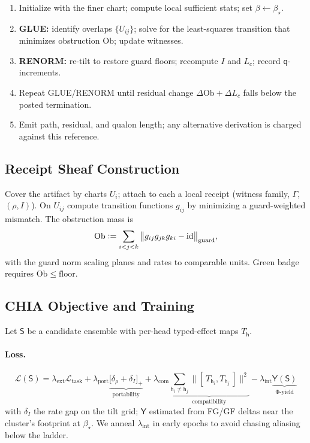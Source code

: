 \documentclass[11pt]{article}
\newcommand{\1}{\mathbf{1}}
\newcommand{\id}{\mathrm{id}}
\newcommand{\defeq}{\vcentcolon=}
\newcommand{\Guard}{\Gamma}
\newcommand{\ratio}{\rho}
\newcommand{\rate}{I}
\newcommand{\Blur}{\beta}
\newcommand{\Lc}{L_c}
\newcommand{\Comm}[2]{[\,#1,#2\,]}
\newcommand{\Qualon}{\mathsf{q}}        %
\newcommand{\Head}{\mathsf{h}}
\newcommand{\Cluster}{\mathsf{S}}
\newcommand{\Yield}{\mathsf{Y}}
\newcommand{\Ob}{\mathrm{Ob}}
\begin{document}
\begin{enumerate}[leftmargin=2.2em,label=\textbf{I\arabic*.}]
\item Initialize with the finer chart; compute local sufficient stats; set $\Blur\leftarrow\Blur_\star$.
\item \textbf{GLUE:} identify overlaps $\{U_{ij}\}$; solve for the least-squares transition that minimizes obstruction $\Ob$; update witnesses.
\item \textbf{RENORM:} re-tilt to restore guard floors; recompute $\rate$ and $\Lc$; record $\Qualon$-increments.
\item Repeat GLUE/RENORM until residual change $\Delta\Ob+\Delta\Lc$ falls below the posted termination.
\item Emit path, residual, and qualon length; any alternative derivation is charged against this reference.
\end{enumerate}

\subsection{Receipt Sheaf Construction}
Cover the artifact by charts $U_i$; attach to each a local receipt (witness family, $\Guard$, $(\ratio,\rate)$). On $U_{ij}$ compute transition functions $g_{ij}$ by minimizing a guard-weighted mismatch. The obstruction mass is
\[
\Ob \defeq \sum_{i<j<k} \big\| g_{ij}g_{jk}g_{ki}-\id \big\|_{\text{guard}},
\]
with the guard norm scaling planes and rates to comparable units. Green badge requires $\Ob\le\text{floor}$.

\subsection{CHIA Objective and Training}
Let $\Cluster$ be a candidate ensemble with per-head typed-effect maps $T_{\Head}$.

\paragraph{Loss.}
\[
\mathcal{L}(\Cluster)=
\lambda_{\text{ext}}\mathcal{L}_{\text{task}}
+\lambda_{\text{port}}\underbrace{\big[\delta_{\ratio}+\delta_{\rate}\big]_+}_{\text{portability}}
+\lambda_{\text{com}}\underbrace{\sum_{\Head_i\neq \Head_j}\|\Comm{T_{\Head_i}}{T_{\Head_j}}\|^2}_{\text{compatibility}}
-\lambda_{\text{int}}\underbrace{\Yield(\Cluster)}_{\text{Φ-yield}}
\]
with $\delta_{\rate}$ the rate gap on the tilt grid; $\Yield$ estimated from FG/GF deltas near the cluster’s footprint at $\Blur_\star$. We anneal $\lambda_{\text{int}}$ in early epochs to avoid chasing aliasing below the ladder.
\end{document}
